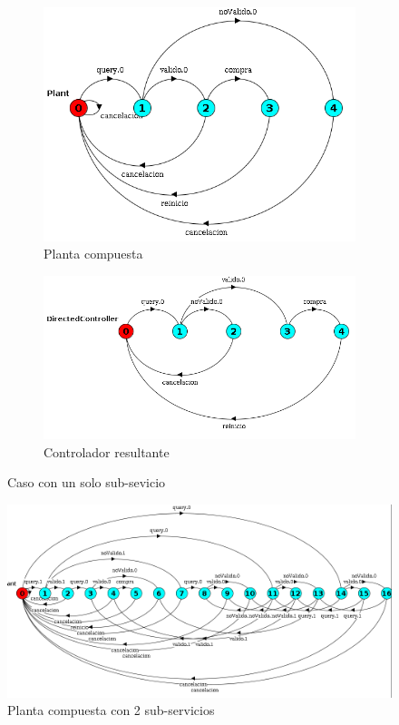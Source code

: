 \begin{figure}[htb]
\begin{center}
{\begin{subfigure}[t]{.5\textwidth}
				\includegraphics[width=\linewidth]{figures/ejemploServicios/N1Planta.png}  
				\caption{Planta compuesta}
				\label{fig:N1Planta}
			\end{subfigure}
			\begin{subfigure}[t]{.5\textwidth}
				\centering
				\includegraphics[width=\linewidth]{figures/ejemploServicios/N1Controlador.png}  
				\caption{Controlador resultante}
				\label{fig:controladorN1}
			\end{subfigure}
		}
		\caption{Caso con un solo sub-sevicio}
		\label{fig:N1}
	\end{center}
\end{figure}

\begin{figure}[htb]
	\includegraphics[width=\linewidth]{figures/ejemploServicios/N2Planta.png}  
	\caption{Planta compuesta con 2 sub-servicios}
	\label{fig:N2}
\end{figure}

